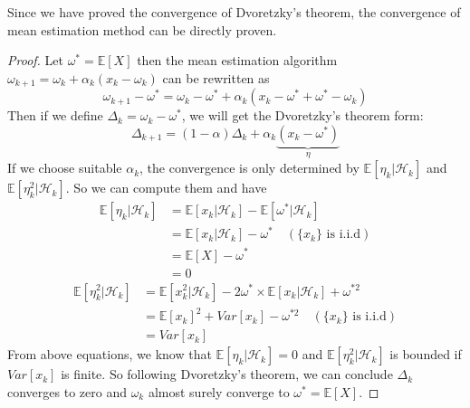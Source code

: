   Since we have proved the convergence of Dvoretzky's theorem, the convergence of mean estimation method can be directly
  proven.
  \begin{proof}
    Let $\omega^{*}=\mathbb{E}[X]$ then the mean estimation algorithm
    $\omega_{k+1}=\omega_{k}+\alpha_{k}(x_{k}-\omega_{k})$ can be rewritten as
    \begin{equation*}
      \omega_{k+1}-\omega^{*} = \omega_{k}-\omega^{*} +\alpha_{k}(x_{k} - \omega^{*} + \omega^{*} -\omega_{k})
    \end{equation*}
    Then if we define $\Delta_k=\omega_{k} - \omega^{*}$, we will get the Dvoretzky's theorem form:
    \begin{equation*}
      \Delta_{k+1} = (1-\alpha)\Delta_{k} + \alpha_{k}\underbrace{(x_{k}-\omega^{*})}_{\eta}
    \end{equation*}
    If we choose suitable $\alpha_{k}$, the convergence is only determined by $\mathbb{E}[\eta_{k}|\mathcal{H}_{k}]$ and
    $\mathbb{E}[\eta_{k}^{2}|\mathcal{H}_{k}]$. So we can compute them and have
    \begin{align*}
      \mathbb{E}[\eta_{k}|\mathcal{H}_{k}] & = \mathbb{E}[x_{k}|\mathcal{H}_{k}] - \mathbb{E}[\omega^{*}|\mathcal{H}_{k}]        \\
                                           & = \mathbb{E}[x_{k}|\mathcal{H}_{k}] - \omega^{*} \quad (\{x_{k}\} \text{ is i.i.d}) \\
                                           & = \mathbb{E}[X] - \omega^{*}                                                        \\
                                           & = 0
    \end{align*}
    \begin{align*}
      \mathbb{E}[\eta_{k}^{2}|\mathcal{H}_{k}] & = \mathbb{E}[x_{k}^{2}|\mathcal{H}_{k}] - 2\omega^{*}\times \mathbb{E}[x_{k}|\mathcal{H}_{k}]+\omega^{*2} \\
                                               & = \mathbb{E}[x_{k}]^{2} + Var[x_{k}] - \omega^{*2} \quad (\{x_{k}\} \text{ is i.i.d})                     \\
                                               & = Var[x_{k}]
    \end{align*}
    From above equations, we know that $\mathbb{E}[\eta_{k}|\mathcal{H}_{k}]=0$ and
    $\mathbb{E}[\eta_{k}^{2}|\mathcal{H}_{k}] $ is bounded if $Var[x_{k}]$ is finite. So following Dvoretzky's theorem, we
    can conclude $\Delta_{k}$ converges to zero and $\omega_{k}$ almost surely converge to $\omega^{*}=\mathbb{E}[X]$.
  \end{proof}

